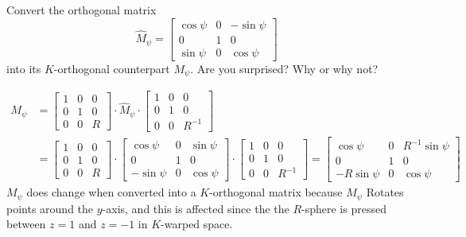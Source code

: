 \documentclass[newpage,hints,handout,noauthor,nooutcomes,12pt]{ximera}
\begin{document}
\begin{problem}
  Convert the orthogonal matrix
  \[
  \hat{M}_\psi=\begin{bmatrix}
  \cos\psi & 0 & -\sin\psi\\
  0 & 1 & 0\\
  \sin\psi & 0 & \cos\psi
  \end{bmatrix}
  \]
  into its $K$-orthogonal counterpart $M_\psi$. Are you surprised? Why or why not?
  
\begin{freeResponse}
\begin{align*}
M_\psi &= \begin{bmatrix}
1 & 0 & 0\\
0 & 1 & 0\\
0 & 0 & R%
\end{bmatrix} \cdot \hat{M}_\psi \cdot
\begin{bmatrix}
1 & 0 & 0\\
0 & 1 & 0\\
0 & 0 & R^{-1}%
\end{bmatrix} \\
&= \begin{bmatrix}
1 & 0 & 0\\
0 & 1 & 0\\
0 & 0 & R%
\end{bmatrix} \cdot 
\begin{bmatrix}
  \cos\psi & 0 & \sin\psi\\
  0 & 1 & 0\\
  -\sin\psi & 0 & \cos\psi
  \end{bmatrix} \cdot
\begin{bmatrix}
1 & 0 & 0\\
0 & 1 & 0\\
0 & 0 & R^{-1}%
\end{bmatrix}
=\begin{bmatrix}
  \cos\psi & 0 & R^{-1} \sin\psi\\
  0 & 1 & 0\\
  -R\sin\psi & 0 & \cos\psi
  \end{bmatrix} 
\end{align*} 
$M_\psi$ does change when converted into a $K$-orthogonal matrix because $M_\psi$ Rotates points around the $y$-axis, and this is affected since the  the $R$-sphere is pressed between $z=1$ and $z=-1$ in $K$-warped space. 
\end{freeResponse}

\end{problem}
\end{document}
